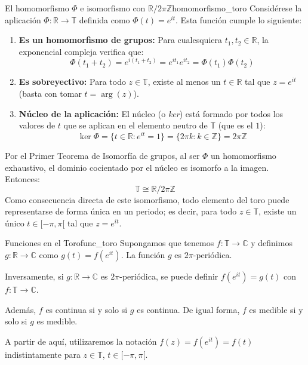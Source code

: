 \begin{nota}{El homomorfismo $\Phi$ e isomorfismo con $\mathbb{R} / 2\pi\mathbb{Z}$}{homomorfismo_toro}
Considérese la aplicación $\Phi: \mathbb{R} \to \mathbb{T}$ definida como $\Phi(t) = e^{it}$. Esta función cumple lo siguiente:
\begin{enumerate}
    \item \textbf{Es un homomorfismo de grupos:} Para cualesquiera $t_1, t_2 \in \mathbb{R}$, la exponencial compleja verifica que:
    \begin{equation*}
        \Phi(t_1 + t_2) = e^{i(t_1+t_2)} = e^{it_1}e^{it_2} = \Phi(t_1)\Phi(t_2)
    \end{equation*}
    \item \textbf{Es sobreyectivo:} Para todo $z \in \mathbb{T}$, existe al menos un $t \in \mathbb{R}$ tal que $z = e^{it}$ (basta con tomar $t = \arg(z)$).
    \item \textbf{Núcleo de la aplicación:} El núcleo (o \textit{ker}) está formado por todos los valores de $t$ que se aplican en el elemento neutro de $\mathbb{T}$ (que es el $1$):
    \begin{equation*}
        \ker \Phi = \{t \in \mathbb{R} : e^{it} = 1\} = \{2\pi k : k \in \mathbb{Z}\} = 2\pi\mathbb{Z}
    \end{equation*}
\end{enumerate}
Por el Primer Teorema de Isomorfía de grupos, al ser $\Phi$ un homomorfismo exhaustivo, el dominio cocientado por el núcleo es isomorfo a la imagen. Entonces:
\begin{equation*}
    \mathbb{T} \cong \mathbb{R} / 2\pi\mathbb{Z}
\end{equation*}
Como consecuencia directa de este isomorfismo, todo elemento del toro puede representarse de forma única en un periodo; es decir, para todo $z \in \mathbb{T}$, existe un único $t \in [-\pi, \pi[$ tal que $z = e^{it}$.
\end{nota}

\begin{nota}{Funciones en el Toro}{func_toro}
Supongamos que tenemos $f:\mathbb{T} \to \mathbb{C}$ y definimos $g:\mathbb{R} \to \mathbb{C}$ como $g(t) = f(e^{it})$. La función $g$ es $2\pi$-periódica.

Inversamente, si $g:\mathbb{R} \to \mathbb{C}$ es $2\pi$-periódica, se puede definir $f(e^{it}) = g(t)$ con $f:\mathbb{T} \to \mathbb{C}$.

Además, $f$ es continua si y solo si $g$ es continua. De igual forma, $f$ es medible si y solo si $g$ es medible.

A partir de aquí, utilizaremos la notación $f(z) = f(e^{it}) = f(t)$ indistintamente para $z \in \mathbb{T}$, $t \in [-\pi,\pi[$.
\end{nota}

